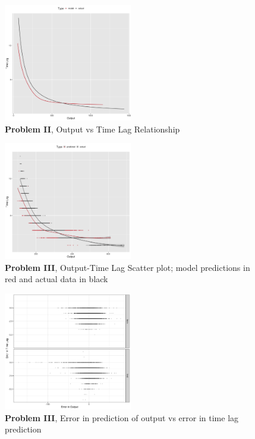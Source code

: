 \documentclass[twoside]{article}
\begin{document}
\begin{figure}[h]
\vspace{.3in}
\centerline{\includegraphics[width=0.5\textwidth]{figures/exp2_predictive_curves.png}}
\vspace{.3in}
\caption{\textbf{Problem II}, Output vs Time Lag Relationship}
\label{fig:problem2_curves}
\end{figure}



\begin{figure}[h]
\vspace{.3in}
\centerline{\includegraphics[width=0.5\textwidth]{figures/exp3_scatter_v_tl.png}}
\vspace{.3in}
\caption{\textbf{Problem III}, Output-Time Lag Scatter plot; model predictions in red and actual data in black}
\label{fig:problem3_scatter}
\end{figure}

\begin{figure}[h]
\vspace{.3in}
\centerline{\includegraphics[width=0.5\textwidth]{figures/exp3_scatter_errors_test.png}}
\vspace{.3in}
\caption{\textbf{Problem III}, Error in prediction of output vs error in time lag prediction}
\label{fig:problem3_error}
\end{figure}
\end{document}
